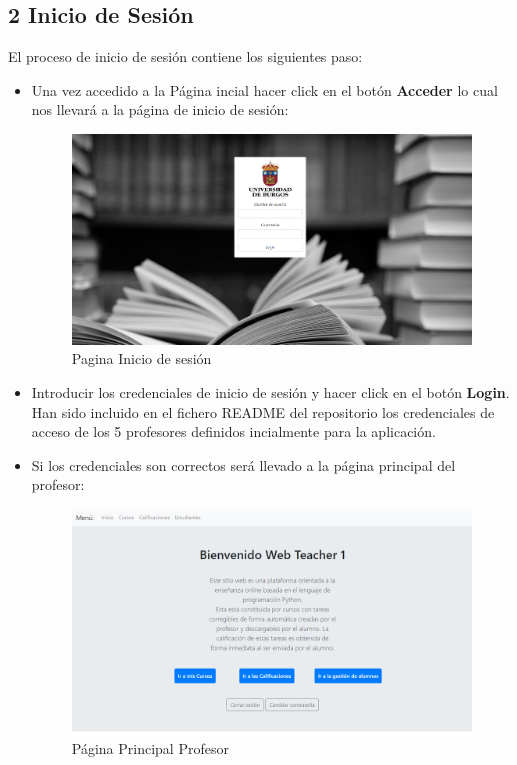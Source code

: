 \subsection{2 Inicio de Sesión}
El proceso de inicio de sesión contiene los siguientes paso:
\begin{itemize}
\tightlist
    \item Una vez accedido a la Página incial hacer click en el botón \textbf{Acceder} lo cual nos llevará a la página de inicio de sesión:
        \begin{figure}[H]
        \centering
        \includegraphics[width=\textwidth]{img/imgs-memoria/InicioSesion.PNG}
        \caption{Pagina Inicio de sesión}
        \end{figure}
    \item Introducir los credenciales de inicio de sesión y hacer click en el botón \textbf{Login}. Han sido incluido en el fichero README del repositorio los credenciales de acceso de los 5 profesores definidos incialmente para la aplicación.
    \item Si los credenciales son correctos será llevado a la página principal del profesor:
        \begin{figure}[H]
        \centering
        \includegraphics[width=\textwidth]{img/imgs-memoria/TeacherMain.PNG}
        \caption{Página Principal Profesor}
        \label{PagProfesor}
        \end{figure}
\end{itemize}


